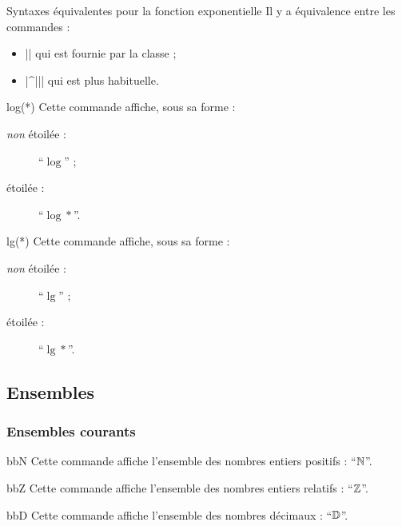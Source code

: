 \documentclass[french,nolocaltoc]{nwejmart}
\newtheorem[title=Fait,style=definition]{fact}
\begin{document}
\begin{dbremark}{Syntaxes équivalentes pour la fonction exponentielle}{}
  Il y a équivalence entre les commandes :
  \begin{itemize}
  \item || qui est fournie par la classe ;
  \item |\E^{||}| qui est plus habituelle.
\end{itemize}
\end{dbremark}

\begin{docCommand}{log(*)}{}
  Cette commande affiche, sous sa forme :
  \begin{description}
  \item[\emph{non} étoilée :] \enquote{$\log$} ;
  \item[étoilée :] \enquote{$\log*$}.
  \end{description}
\end{docCommand}

\begin{docCommand}{lg(*)}{}
  Cette commande affiche, sous sa forme :
  \begin{description}
  \item[\emph{non} étoilée :] \enquote{$\lg$} ;
  \item[étoilée :] \enquote{$\lg*$}.
  \end{description}
\end{docCommand}

\subsection{Ensembles}

\subsubsection{Ensembles courants}

\begin{docCommand}{bbN}{}
  Cette commande affiche l'ensemble des nombres entiers positifs :
  \enquote{$\mathbb{N}$}.
\end{docCommand}

\begin{docCommand}{bbZ}{}
  Cette commande affiche l'ensemble des nombres entiers relatifs :
  \enquote{$\mathbb{Z}$}.
\end{docCommand}

\begin{docCommand}{bbD}{}
  Cette commande affiche l'ensemble des nombres décimaux : \enquote{$\mathbb{D}$}.
\end{docCommand}
\end{document}
